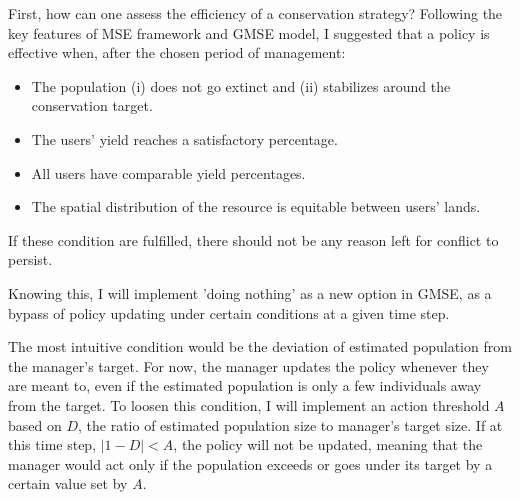 \documentclass[12pt,a4paper]{article}
\begin{document}
First, how can one assess the efficiency of a conservation strategy?
Following the key features of MSE framework and GMSE model, I suggested that a policy is effective when, after the chosen period of management:
\begin{itemize}
    \item The population (i) does not go extinct and (ii) stabilizes around the conservation target.
    \item The users' yield reaches a satisfactory percentage.
    \item All users have comparable yield percentages.
    \item The spatial distribution of the resource is equitable between users' lands.
\end{itemize}
If these condition are fulfilled, there should not be any reason left for conflict to persist.

Knowing this, I will implement 'doing nothing' as a new option in GMSE, as a bypass of policy updating under certain conditions at a given time step.


The most intuitive condition would be the deviation of estimated population from the manager's target.
For now, the manager updates the policy whenever they are meant to, even if the estimated population is only a few individuals away from the target.
To loosen this condition, I will implement an action threshold $A$ based on $D$, the ratio of estimated population size to manager's target size.
If at this time step, $|1 - D| < A$, the policy will not be updated, meaning that the manager would act only if the population exceeds or goes under its target by a certain value set by $A$. %
\end{document}
